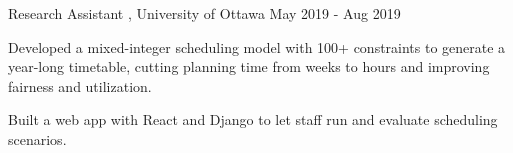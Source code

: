 \experienceheader
    {Research Assistant}
    {\small , University of Ottawa}
    {May 2019 - Aug 2019}
    {}
\begin{zitemize}
    \item Developed a mixed-integer scheduling model with 100+ constraints to generate a year-long timetable, cutting planning time from weeks to hours and improving fairness and utilization.
    \item Built a web app with React and Django to let staff run and evaluate scheduling scenarios.
\end{zitemize}